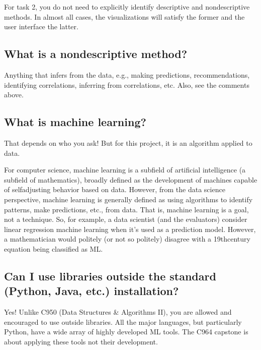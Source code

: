 \documentclass[letterpaper,10pt,english]{jupyterBook}
\begin{document}
\sphinxAtStartPar
For task 2, you do not need to explicitly identify descriptive and non\sphinxhyphen{}descriptive methods. In almost all cases, the visualizations will satisfy the former and the user interface the latter.


\subsection{What is a non\sphinxhyphen{}descriptive method?}
\label{\detokenize{task2_c/task2_part_c:what-is-a-non-descriptive-method}}
\sphinxAtStartPar
Anything that infers from the data, e.g., making predictions, recommendations, identifying correlations, inferring from correlations, etc. Also, see the comments above.


\subsection{What is machine learning?}
\label{\detokenize{task2_c/task2_part_c:what-is-machine-learning}}\label{\detokenize{task2_c/task2_part_c:task1-faq-what-is-machine-learning}}
\sphinxAtStartPar
That depends on who you ask! But for this project, it is an algorithm applied to data.

\sphinxAtStartPar
For computer science, machine learning is a subfield of artificial intelligence (a subfield of mathematics), broadly defined as the development of machines capable of self\sphinxhyphen{}adjusting behavior based on data. However, from the data science perspective, machine learning is generally defined as using algorithms to identify patterns, make predictions, etc., from data. That is, machine learning is a goal, not a technique. So, for example, a data scientist (and the evaluators) consider linear regression machine learning \sphinxhyphen{}when it’s used as a prediction model. However, a mathematician would politely (or not so politely) disagree with a 19th\sphinxhyphen{}century equation being classified as ML.


\subsection{Can I use libraries outside the standard (Python, Java, etc.) installation?}
\label{\detokenize{task2_c/task2_part_c:can-i-use-libraries-outside-the-standard-python-java-etc-installation}}
\sphinxAtStartPar
Yes! Unlike C950 (Data Structures \& Algorithms II), you are allowed and encouraged to use outside libraries. All the major languages, but particularly Python, have a wide array of highly developed ML tools. The C964 capstone is about applying these tools \sphinxhyphen{}not their development.
\end{document}
